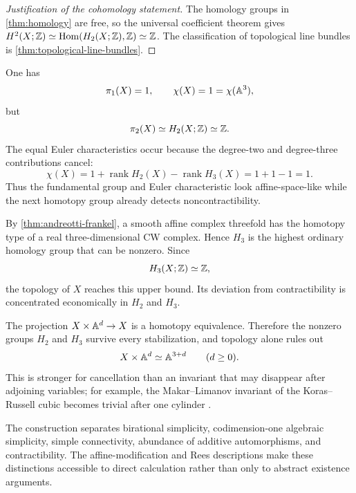 \begin{proof}[Justification of the cohomology statement]
The homology groups in \cref{thm:homology} are free, so the universal coefficient theorem gives $H^2(X;\mathbb Z)\simeq\operatorname{Hom}(H_2(X;\mathbb Z),\mathbb Z)\simeq\mathbb Z$.  The classification of topological line bundles is \cref{thm:topological-line-bundles}.
\end{proof}

\begin{observation}\label{obs:pi1-chi-contractibility}
One has
\[
  \pi_1(X)=1,
  \qquad
  \chi(X)=1=\chi(\mathbb A^3),
\]
but
\[
  \pi_2(X)\simeq H_2(X;\mathbb Z)\simeq\mathbb Z.
\]
The equal Euler characteristics occur because the degree-two and degree-three contributions cancel:
\[
  \chi(X)=1+\operatorname{rank}H_2(X)-\operatorname{rank}H_3(X)=1+1-1=1.
\]
Thus the fundamental group and Euler characteristic look affine-space-like while the next homotopy group already detects noncontractibility.
\end{observation}

\begin{observation}\label{obs:andreotti-frankel-sharp}
By \cref{thm:andreotti-frankel}, a smooth affine complex threefold has the homotopy type of a real three-dimensional CW complex.  Hence $H_3$ is the highest ordinary homology group that can be nonzero.  Since
\[
  H_3(X;\mathbb Z)\simeq\mathbb Z,
\]
the topology of $X$ reaches this upper bound.  Its deviation from contractibility is concentrated economically in $H_2$ and $H_3$.
\end{observation}

\begin{observation}\label{obs:stable-topology}
The projection $X\times\mathbb A^d\to X$ is a homotopy equivalence.  Therefore the nonzero groups $H_2$ and $H_3$ survive every stabilization, and topology alone rules out
\[
  X\times\mathbb A^d\simeq\mathbb A^{3+d}
  \qquad(d\geq0).
\]
This is stronger for cancellation than an invariant that may disappear after adjoining variables; for example, the Makar--Limanov invariant of the Koras--Russell cubic becomes trivial after one cylinder \cite{Dubouloz2009}.
\end{observation}

\begin{remark}\label{rem:five-notions}
The construction separates birational simplicity, codimension-one algebraic simplicity, simple connectivity, abundance of additive automorphisms, and contractibility.  The affine-modification and Rees descriptions make these distinctions accessible to direct calculation rather than only to abstract existence arguments.
\end{remark}

